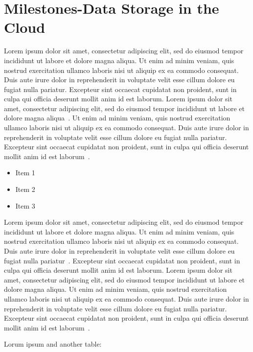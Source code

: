 \documentclass[letterpaper, 10 pt, conference]{ieeeconf}  %
\begin{document}
\section{Milestones-Data Storage in the Cloud}

Lorem ipsum dolor sit amet, consectetur adipiscing elit, sed do eiusmod tempor incididunt ut labore et dolore magna aliqua. Ut enim ad minim veniam, quis nostrud exercitation ullamco laboris nisi ut aliquip ex ea commodo consequat. Duis aute irure dolor in reprehenderit in voluptate velit esse cillum dolore eu fugiat nulla pariatur. Excepteur sint occaecat cupidatat non proident, sunt in culpa qui officia deserunt mollit anim id est laborum. Lorem ipsum dolor sit amet, consectetur adipiscing elit, sed do eiusmod tempor incididunt ut labore et dolore magna aliqua~\cite{Cite7}. Ut enim ad minim veniam, quis nostrud exercitation ullamco laboris nisi ut aliquip ex ea commodo consequat. Duis aute irure dolor in reprehenderit in voluptate velit esse cillum dolore eu fugiat nulla pariatur. Excepteur sint occaecat cupidatat non proident, sunt in culpa qui officia deserunt mollit anim id est laborum~\cite{Cite8}.

\begin{itemize}
	\item Item 1
	\item Item 2
	\item Item 3
\end{itemize}

Lorem ipsum dolor sit amet, consectetur adipiscing elit, sed do eiusmod tempor incididunt ut labore et dolore magna aliqua. Ut enim ad minim veniam, quis nostrud exercitation ullamco laboris nisi ut aliquip ex ea commodo consequat. Duis aute irure dolor in reprehenderit in voluptate velit esse cillum dolore eu fugiat nulla pariatur~\cite{Cite9}. Excepteur sint occaecat cupidatat non proident, sunt in culpa qui officia deserunt mollit anim id est laborum. Lorem ipsum dolor sit amet, consectetur adipiscing elit, sed do eiusmod tempor incididunt ut labore et dolore magna aliqua. Ut enim ad minim veniam, quis nostrud exercitation ullamco laboris nisi ut aliquip ex ea commodo consequat. Duis aute irure dolor in reprehenderit in voluptate velit esse cillum dolore eu fugiat nulla pariatur. Excepteur sint occaecat cupidatat non proident, sunt in culpa qui officia deserunt mollit anim id est laborum~\cite{Cite10}.

Lorum ipsum and another table:
\end{document}
